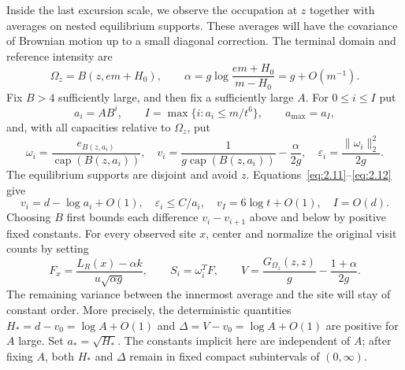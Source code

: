 \documentclass[11pt,a4paper]{article}
\numberwithin{equation}{section}
\theoremstyle{remark}
\begin{document}
\label{sec:averageconstraints}
Inside the last excursion scale, we observe the occupation at $z$ together with averages on nested equilibrium supports. These averages will have the covariance of Brownian motion up to a small diagonal correction. The terminal domain and reference intensity are
\begin{equation}\label{eq:5.6}
\Omega_z=B(z,em+H_0),\qquad
\alpha=g\log\frac{em+H_0}{m-H_0}=g+O(m^{-1}).
\end{equation}
Fix $B>4$ sufficiently large, and then fix a sufficiently large $A$.
For $0\le i\le I$ put
\begin{equation}\label{eq:5.7}
a_i=AB^i,\qquad I=\max\{i:a_i\le m/t^6\},\qquad a_{\max}=a_I,
\end{equation}
and, with all capacities relative to $\Omega_z$, put
\begin{equation}\label{eq:5.8}
\omega_i=\frac{e_{B(z,a_i)}}{\operatorname{cap}(B(z,a_i))},\quad
v_i=\frac1{g\operatorname{cap}(B(z,a_i))}-\frac\alpha{2g},\quad
\varepsilon_i=\frac{\|\omega_i\|_2^2}{2g}.
\end{equation}
The equilibrium supports are disjoint and avoid $z$. Equations~\eqref{eq:2.11}--\eqref{eq:2.12} give
\begin{equation}\label{eq:5.9}
v_i=d-\log a_i+O(1),\quad \varepsilon_i\le C/a_i,\quad
v_I=6\log t+O(1),\quad I=O(d).
\end{equation}
Choosing $B$ first bounds each difference $v_i-v_{i+1}$ above and below by positive fixed constants.
For every observed site $x$, center and normalize the original visit counts by setting
\[
F_x=\frac{L_R(x)-\alpha k}{u\sqrt{\alpha g}},\qquad
S_i=\omega_i^TF,\qquad
V=\frac{G_{\Omega_z}(z,z)}g-\frac{1+\alpha}{2g}.
\]
The remaining variance between the innermost average and the site will stay of constant order. More precisely, the deterministic quantities $H_*=d-v_0=\log A+O(1)$ and
$\Delta=V-v_0=\log A+O(1)$ are positive for $A$ large. Set $a_*=\sqrt{H_*}$.
The constants implicit here are independent of $A$; after fixing $A$, both $H_*$ and $\Delta$ remain in fixed compact subintervals of $(0,\infty)$.
\end{document}
